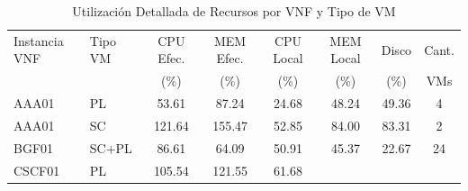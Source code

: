 \documentclass[11pt,a4paper]{article}
\begin{document}
\begin{table}[H]
\centering
\caption{Utilización Detallada de Recursos por VNF y Tipo de VM}
\label{tab:vnf_vmtype_stats}
\begin{tabular}{llcccccc}
\toprule
Instancia VNF & Tipo VM & CPU Efec. & MEM Efec. & CPU Local & MEM Local & Disco & Cant. \\
 & & (\%) & (\%) & (\%) & (\%) & (\%) & VMs \\
\midrule


    AAA01 &
    PL &

    
        53.61
     &

    
        87.24
     &

    
        24.68
     &

    
        48.24
     &

    
        49.36
     &

    
        4
    
    \\

    AAA01 &
    SC &

    
        121.64
     &

    
        155.47
     &

    
        52.85
     &

    
        84.00
     &

    
        83.31
     &

    
        2
    
    \\

    BGF01 &
    SC+PL &

    
        86.61
     &

    
        64.09
     &

    
        50.91
     &

    
        45.37
     &

    
        22.67
     &

    
        24
    
    \\

    CSCF01 &
    PL &

    
        105.54
     &

    
        121.55
     &

    
        61.68
     &


\end{tabular}
\end{table}
\end{document}

